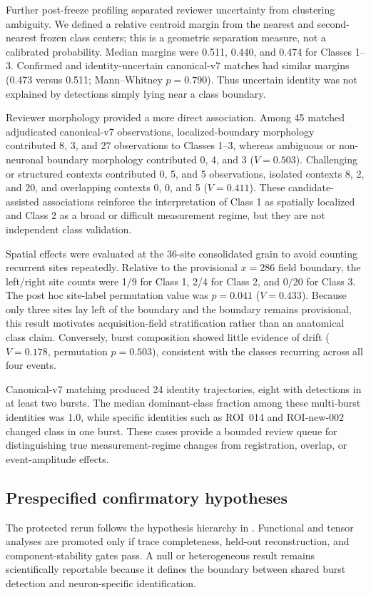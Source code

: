 Further post-freeze profiling separated reviewer uncertainty from clustering ambiguity. We defined a relative centroid margin from the nearest and second-nearest frozen class centers; this is a geometric separation measure, not a calibrated probability. Median margins were 0.511, 0.440, and 0.474 for Classes 1--3. Confirmed and identity-uncertain canonical-v7 matches had similar margins (0.473 versus 0.511; Mann--Whitney $p=0.790$). Thus uncertain identity was not explained by detections simply lying near a class boundary.

Reviewer morphology provided a more direct association. Among 45 matched adjudicated canonical-v7 observations, localized-boundary morphology contributed 8, 3, and 27 observations to Classes 1--3, whereas ambiguous or non-neuronal boundary morphology contributed 0, 4, and 3 ($V=0.503$). Challenging or structured contexts contributed 0, 5, and 5 observations, isolated contexts 8, 2, and 20, and overlapping contexts 0, 0, and 5 ($V=0.411$). These candidate-assisted associations reinforce the interpretation of Class 1 as spatially localized and Class 2 as a broad or difficult measurement regime, but they are not independent class validation.

Spatial effects were evaluated at the 36-site consolidated grain to avoid counting recurrent sites repeatedly. Relative to the provisional $x=286$ field boundary, the left/right site counts were 1/9 for Class 1, 2/4 for Class 2, and 0/20 for Class 3. The post hoc site-label permutation value was $p=0.041$ ($V=0.433$). Because only three sites lay left of the boundary and the boundary remains provisional, this result motivates acquisition-field stratification rather than an anatomical class claim. Conversely, burst composition showed little evidence of drift ($V=0.178$, permutation $p=0.503$), consistent with the classes recurring across all four events.

Canonical-v7 matching produced 24 identity trajectories, eight with detections in at least two bursts. The median dominant-class fraction among these multi-burst identities was 1.0, while specific identities such as ROI~014 and ROI-new-002 changed class in one burst. These cases provide a bounded review queue for distinguishing true measurement-regime changes from registration, overlap, or event-amplitude effects.

\subsection{Prespecified confirmatory hypotheses}

The protected rerun follows the hypothesis hierarchy in . Functional and tensor analyses are promoted only if trace completeness, held-out reconstruction, and component-stability gates pass. A null or heterogeneous result remains scientifically reportable because it defines the boundary between shared burst detection and neuron-specific identification.



